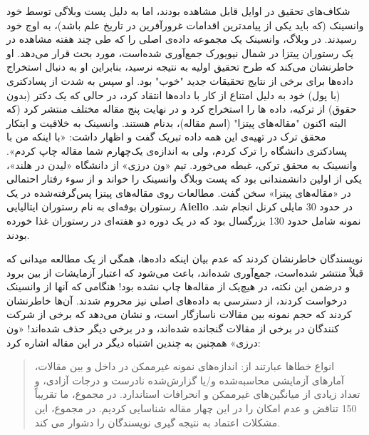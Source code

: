 شکاف‌های تحقیق در اوایل قابل مشاهده بودند، اما به دلیل پست وبلاگی توسط خود وانسینک (که باید یکی از پیامدترین اقدامات غرورآفرین در تاریخ علم باشد)، به اوج خود رسیدند.
در وبلاگ، وانسینک یک مجموعه داده‌ی اصلی را که طی چند هفته مشاهده در یک رستوران پیتزا در شمال نیویورک جمع‌آوری شده‌است، مورد بحث قرار می‌دهد.
او خاطرنشان می‌کند که طرح تحقیق اولیه به نتیجه نرسید، بنابراین او به دنبال استخراج داده‌ها برای برخی از نتایج تحقیقات جدید "خوب" بود.
او سپس به شدت از پسادکتری (با پول) خود به دلیل امتناع از کار با داده‌ها انتقاد کرد، در حالی که یک دکتر (بدون حقوق) از ترکیه، داده ها را استخراج کرد و در نهایت پنج مقاله مختلف منتشر کرد (که البته اکنون "مقاله‌های پیتزا" (اسم مقاله)، بدنام هستند.
وانسینک به خلاقیت و ابتکار محقق ترک در تهیه‌ی این همه داده تبریک گفت و اظهار داشت: «با اینکه من با پسادکتری دانشگاه را ترک کردم، ولی به اندازه‌ی یک‌چهارم شما مقاله چاپ کردم».
وانسینک به محقق ترکی، غبطه می‌خورد.
تیم «ون درزی» از دانشگاه «لیدن در هلند»، یکی از اولین دانشمندانی بود که پست وبلاگ وانسینک را خواند و از سوء رفتار احتمالی در «مقاله‌های پیتزا» سخن گفت.
مطالعات روی مقاله‌های پیتزا پس‌گرفته‌شده در یک رستوران بوفه‌ای به نام رستوران ایتالیایی \textenglish{\textbf{Aiello}} در حدود 30 مایلی کرنل انجام شد.
نمونه شامل حدود 130 بزرگسال بود که در یک دوره دو هفته‌ای در رستوران غذا خورده بودند.

نویسندگان خاطرنشان کردند که عدم بیان اینکه داده‌ها، همگی از یک مطالعه میدانی که قبلاً منتشر شده‌است، جمع‌آوری شده‌اند، باعث می‌شود که اعتبار آزمایشات از بین برود و درضمن این نکته، در هیچ‌یک از مقاله‌ها چاپ نشده بود!
هنگامی که آنها از وانسینک درخواست کردند، از دسترسی به داده‌های اصلی نیز محروم شدند.
آن‌ها خاطرنشان کردند که حجم نمونه بین مقالات ناسازگار است، و نشان می‌دهد که برخی از شرکت کنندگان در برخی از مقالات گنجانده شده‌اند، و در برخی دیگر حذف شده‌اند!
«ون درزی» همچنین به چندین اشتباه دیگر در این مقاله اشاره کرد:

\begin{quote}
    انواع خطاها عبارتند از: اندازه‌های نمونه غیرممکن در داخل و بین مقالات، آمارهای آزمایشی محاسبه‌شده و/یا گزارش‌شده نادرست و درجات آزادی، و تعداد زیادی از میانگین‌های غیرممکن و انحرافات استاندارد.
    در مجموع، ما تقریباً 150 تناقض و عدم امکان را در این چهار مقاله شناسایی کردیم.
    در مجموع، این مشکلات اعتماد به نتیجه گیری نویسندگان را دشوار می کند.
\end{quote}

